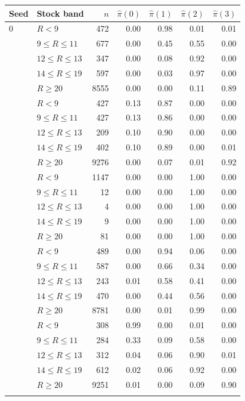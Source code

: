 \begin{tabular}{llrrrrr}
\toprule
Seed & Stock band & $n$ & $\hat\pi(0)$ & $\hat\pi(1)$ & $\hat\pi(2)$ & $\hat\pi(3)$ \\
\midrule
0 & $R<9$ & 472 & 0.00 & 0.98 & 0.01 & 0.01 \\
 & $9\le R\le 11$ & 677 & 0.00 & 0.45 & 0.55 & 0.00 \\
 & $12\le R\le 13$ & 347 & 0.00 & 0.08 & 0.92 & 0.00 \\
 & $14\le R\le 19$ & 597 & 0.00 & 0.03 & 0.97 & 0.00 \\
 & $R\ge 20$ & 8555 & 0.00 & 0.00 & 0.11 & 0.89 \\
\addlinespace
1 & $R<9$ & 427 & 0.13 & 0.87 & 0.00 & 0.00 \\
 & $9\le R\le 11$ & 427 & 0.13 & 0.86 & 0.00 & 0.00 \\
 & $12\le R\le 13$ & 209 & 0.10 & 0.90 & 0.00 & 0.00 \\
 & $14\le R\le 19$ & 402 & 0.10 & 0.89 & 0.00 & 0.01 \\
 & $R\ge 20$ & 9276 & 0.00 & 0.07 & 0.01 & 0.92 \\
\addlinespace
2 & $R<9$ & 1147 & 0.00 & 0.00 & 1.00 & 0.00 \\
 & $9\le R\le 11$ & 12 & 0.00 & 0.00 & 1.00 & 0.00 \\
 & $12\le R\le 13$ & 4 & 0.00 & 0.00 & 1.00 & 0.00 \\
 & $14\le R\le 19$ & 9 & 0.00 & 0.00 & 1.00 & 0.00 \\
 & $R\ge 20$ & 81 & 0.00 & 0.00 & 1.00 & 0.00 \\
\addlinespace
3 & $R<9$ & 489 & 0.00 & 0.94 & 0.06 & 0.00 \\
 & $9\le R\le 11$ & 587 & 0.00 & 0.66 & 0.34 & 0.00 \\
 & $12\le R\le 13$ & 243 & 0.01 & 0.58 & 0.41 & 0.00 \\
 & $14\le R\le 19$ & 470 & 0.00 & 0.44 & 0.56 & 0.00 \\
 & $R\ge 20$ & 8781 & 0.00 & 0.01 & 0.99 & 0.00 \\
\addlinespace
4 & $R<9$ & 308 & 0.99 & 0.00 & 0.01 & 0.00 \\
 & $9\le R\le 11$ & 284 & 0.33 & 0.09 & 0.58 & 0.00 \\
 & $12\le R\le 13$ & 312 & 0.04 & 0.06 & 0.90 & 0.01 \\
 & $14\le R\le 19$ & 612 & 0.02 & 0.06 & 0.92 & 0.00 \\
 & $R\ge 20$ & 9251 & 0.01 & 0.00 & 0.09 & 0.90 \\
\addlinespace
\bottomrule
\end{tabular}
